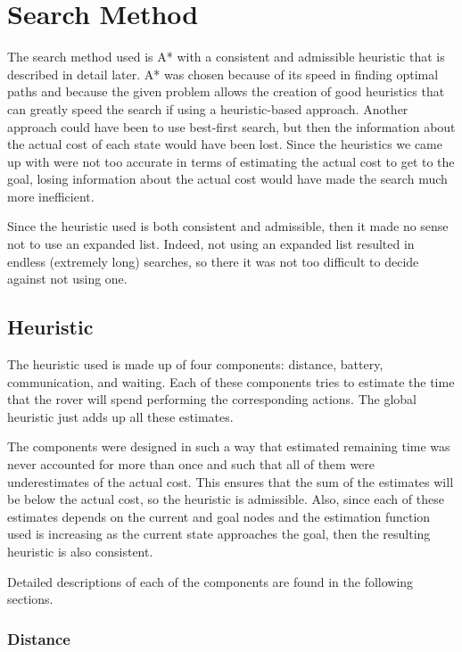 \section{Search Method}

The search method used is A* with a consistent and admissible heuristic that is described in detail later.
A* was chosen because of its speed
in finding optimal paths and because the given problem allows the creation of good heuristics that can
greatly speed the search if using a heuristic-based approach. Another approach could have been to
use best-first search, but then the information about the actual cost of each state would have been lost.
Since the heuristics we came up with were not too accurate in terms of estimating the actual cost to get to
the goal, losing information about the actual cost would have made the search much more inefficient.

Since the heuristic used is both consistent and admissible, then it made no sense not to use an expanded list.
Indeed, not using an expanded list resulted in endless (extremely long) searches, so there it was not too
difficult to decide against not using one.

	\subsection{Heuristic}
	
	The heuristic used is made up of four components: distance, battery, communication, and	waiting. Each of these
	components tries to estimate the time that the rover will spend performing the corresponding actions. The
	global heuristic just adds up all these estimates.
	
	The components were designed in such a way that estimated remaining time was never accounted for more than once
	and such that all of them were underestimates of the actual cost. This ensures that the sum of the estimates
	will be below the actual cost, so the heuristic is admissible. Also, since each of these estimates depends on
	the current and goal nodes and the estimation function used is increasing as the current state approaches the
	goal, then the resulting heuristic is also consistent.
	
	Detailed descriptions of each of the components are found in the following sections.
	
		\subsubsection{Distance}
		
